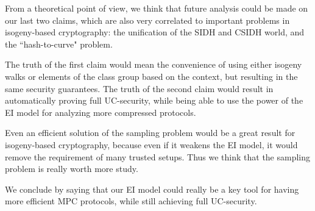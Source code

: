 From a theoretical point of view, we think that future analysis could be made on our last two claims, which are also very correlated to important problems in isogeny-based cryptography: the unification of the SIDH and CSIDH world, and the ``hash-to-curve" problem.

The truth of the first claim would mean the convenience of using either isogeny walks or elements of the class group based on the context, but resulting in the same security guarantees. The truth of the second claim would result in automatically proving full UC-security, while being able to use the power of the EI model for analyzing more compressed protocols.

Even an efficient solution of the sampling problem would be a great result for isogeny-based cryptography, because even if it weakens the EI model, it would remove the requirement of many trusted setups. Thus we think that the sampling problem is really worth more study.

We conclude by saying that our EI model could really be a key tool for having more efficient MPC protocols, while still achieving full UC-security.
